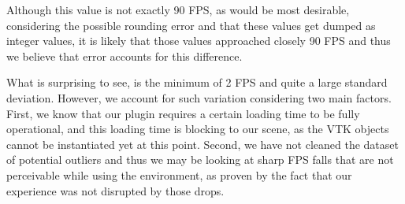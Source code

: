 Although this value is not exactly 90 FPS, as would be most desirable, considering the possible rounding error and that these values get dumped as integer values, it is likely that those values approached closely 90 FPS and thus we believe that error accounts for this difference.

What is surprising to see, is the minimum of 2 FPS and quite a large standard deviation. However, we account for such variation considering two main factors. First, we know that our plugin requires a certain loading time to be fully operational, and this loading time is blocking to our scene, as the VTK objects cannot be instantiated yet at this point. Second, we have not cleaned the dataset of potential outliers and thus we may be looking at sharp FPS falls that are not perceivable while using the environment, as proven by the fact that our experience was not disrupted by those drops.

